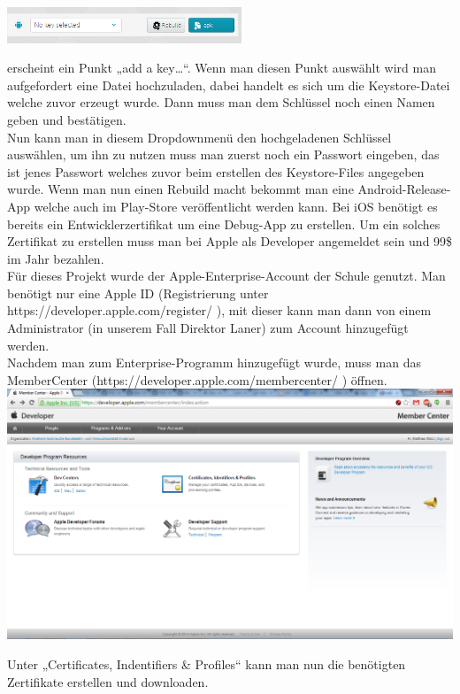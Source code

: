 \includegraphics[keepaspectratio=true, width=7cm]{images/phoneGap/PhoneGap3.png}

erscheint ein Punkt „add a key…“. Wenn man diesen Punkt auswählt wird man aufgefordert eine Datei hochzuladen, dabei handelt es sich um die Keystore-Datei welche zuvor erzeugt wurde. Dann muss man dem Schlüssel noch einen Namen geben und bestätigen.\\
Nun kann man in diesem Dropdownmenü den hochgeladenen Schlüssel auswählen, um ihn zu nutzen muss man zuerst noch ein Passwort eingeben, das ist jenes Passwort welches zuvor beim erstellen des Keystore-Files angegeben wurde. Wenn man nun einen Rebuild macht bekommt man eine Android-Release-App welche auch im Play-Store veröffentlicht werden kann.
Bei iOS benötigt es bereits ein Entwicklerzertifikat um eine Debug-App zu erstellen. Um ein solches Zertifikat zu erstellen muss man bei Apple als Developer angemeldet sein und 99\$ im Jahr bezahlen.\\
Für dieses Projekt wurde der Apple-Enterprise-Account der Schule genutzt. Man benötigt nur eine Apple ID (Registrierung unter https://developer.apple.com/register/ ), mit dieser kann man dann von einem Administrator (in unserem Fall Direktor Laner) zum Account hinzugefügt werden.\\
Nachdem man zum Enterprise-Programm hinzugefügt wurde, muss man das MemberCenter (https://developer.apple.com/membercenter/ ) öffnen.\\

\includegraphics[keepaspectratio=true, width=14cm]{images/phoneGap/AppleMemberCenter1.png}

Unter „Certificates, Indentifiers \& Profiles“ kann man nun die benötigten Zertifikate erstellen und downloaden.\\

